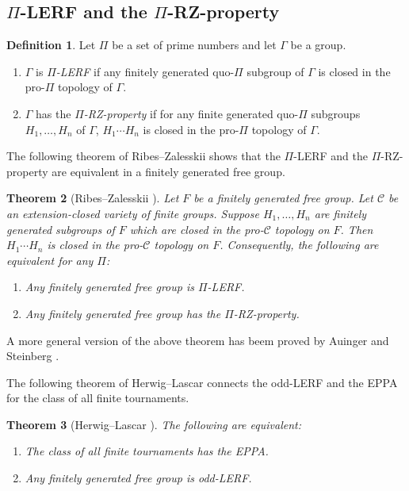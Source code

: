 \documentclass[11pt]{amsart}
\newtheorem{theorem}{Theorem}[section]
\theoremstyle{definition}
\newtheorem{definition}[theorem]{Definition}
\theoremstyle{definition}
\numberwithin{equation}{section}
\begin{document}
\subsection{$\Pi$-LERF and the $\Pi$-RZ-property}

\begin{definition} Let $\Pi$ be a set of prime numbers and let $\Gamma$ be a group.
\begin{enumerate}
\item[(i)] $\Gamma$ is {\em $\Pi$-LERF} if any finitely generated quo-$\Pi$ subgroup of $\Gamma$ is closed in the pro-$\Pi$ topology of $\Gamma$.
\item[(ii)] $\Gamma$ has the {\em $\Pi$-RZ-property} if for any finite generated quo-$\Pi$ subgroups $H_1, \dots, H_n$ of $\Gamma$, $H_1\cdots H_n$ is closed in the pro-$\Pi$ topology of $\Gamma$.
\end{enumerate}
\end{definition}



The following theorem of Ribes--Zalesskii shows that the $\Pi$-LERF and the $\Pi$-RZ-property are equivalent in a finitely generated free group.

\begin{theorem}[Ribes--Zalesskii {\cite[Theorem 5.1]{RZ94}}] Let $F$ be a finitely generated free group. Let $\mathcal{C}$ be an extension-closed variety of finite groups. Suppose $H_1, \dots, H_n$ are finitely generated subgroups of $F$ which are closed in the pro-$\mathcal{C}$ topology on $F$. Then $H_1\cdots H_n$ is closed in the pro-$\mathcal{C}$ topology on $F$. Consequently, the following are equivalent for any $\Pi$:
\begin{enumerate}
\item[(a)] Any finitely generated free group is $\Pi$-LERF.
\item[(b)] Any finitely generated free group has the $\Pi$-RZ-property.
\end{enumerate}
\end{theorem}

A more general version of the above theorem has beem proved by Auinger and Steinberg \cite[Theorem 3.5]{AS05}.

The following theorem of Herwig--Lascar connects the odd-LERF and the EPPA for the class of all finite tournaments.

\begin{theorem}[Herwig--Lascar \cite{HL00}]\label{thm:HL} The following are equivalent:
\begin{enumerate}
\item[(a)] The class of all finite tournaments has the EPPA.
\item[(b)] Any finitely generated free group is odd-LERF.
\end{enumerate}
\end{theorem}
\end{document}
